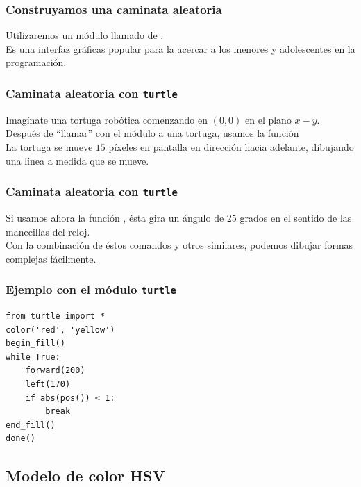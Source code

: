 \documentclass[12pt]{beamer}
\begin{document}
\begin{frame}
\frametitle{Construyamos una caminata aleatoria}
Utilizaremos un módulo llamado  de \python.
\\
\bigskip
\pause
Es una interfaz gráficas popular para la acercar a los menores y adolescentes en la programación.
\end{frame}
\begin{frame}
\frametitle{Caminata aleatoria con \texttt{turtle}}
Imagínate una tortuga robótica comenzando en $(0, 0)$ en el plano $x-y$.
\\
\bigskip
\pause
Después de \enquote{llamar} con el módulo a una tortuga, usamos la función 
\\
\bigskip
\pause
La tortuga se mueve $15$ píxeles en pantalla en dirección hacia adelante, dibujando una línea a medida que se mueve.
\end{frame}
\begin{frame}
\frametitle{Caminata aleatoria con \texttt{turtle}}
Si usamos ahora la función , ésta gira un ángulo de $25$ grados en el sentido de las manecillas del reloj.
\\
\bigskip
\pause
Con la combinación de éstos comandos y otros similares, podemos dibujar formas complejas fácilmente.
\end{frame}
\begin{frame}[fragile]
\frametitle{Ejemplo con el módulo \texttt{turtle}}
\begin{lstlisting}[caption=Generando una imagen sencilla]
from turtle import *
color('red', 'yellow')
begin_fill()
while True:
    forward(200)
    left(170)
    if abs(pos()) < 1:
        break
end_fill()
done()
\end{lstlisting}
\end{frame}

\subsection*{Modelo de color HSV}
\end{document}
